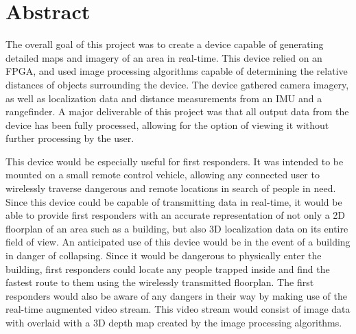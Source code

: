 {}
\section*{Abstract}
The overall goal of this project was to create a device capable of generating detailed maps and imagery of an area in real-time. This device relied on an FPGA, and used image processing algorithms capable of determining the relative distances of objects surrounding the device. The device gathered camera imagery, as well as localization data and distance measurements from an IMU and a rangefinder.  A major deliverable of this project was that all output data from the device has been fully processed, allowing for the option of viewing it without further processing by the user.
\par
This device would be especially useful for first responders. It was intended to be mounted on a small remote control vehicle, allowing any connected user to wirelessly traverse dangerous and remote locations in search of people in need. Since this device could be capable of transmitting data in real-time, it would be able to provide first responders with an accurate representation of not only a 2D floorplan of an area such as a building, but also 3D localization data on its entire field of view. An anticipated use of this device would be in the event of a building in danger of collapsing. Since it would be dangerous to physically enter the building, first responders could locate any people trapped inside and find the fastest route to them using the wirelessly transmitted floorplan. The first responders would also be aware of any dangers in their way by making use of the real-time augmented video stream. This video stream would consist of image data with overlaid with a 3D depth map created by the image processing algorithms.